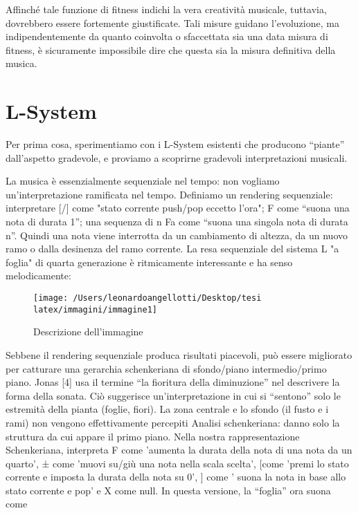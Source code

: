 \documentclass[a4paper,12pt]{report}
\begin{document}
Affinché tale funzione di fitness indichi la vera creatività musicale, tuttavia, dovrebbero essere fortemente giustificate. Tali misure guidano l’evoluzione, ma indipendentemente da quanto coinvolta o sfaccettata sia una data misura di fitness, è sicuramente impossibile dire che questa sia la misura definitiva della musica.

\section{L-System}

Per prima cosa, sperimentiamo con i L-System esistenti che producono “piante” dall’aspetto gradevole, e proviamo a scoprirne gradevoli interpretazioni musicali.

La musica è essenzialmente sequenziale nel tempo: non vogliamo un'interpretazione ramificata nel tempo. 
Definiamo un rendering sequenziale: interpretare [/] come "stato corrente push/pop eccetto l'ora"; 
F come “suona una nota di durata 1”; 
una sequenza di n Fa come “suona una singola nota di durata n”. 
Quindi una nota viene interrotta da un cambiamento di altezza, da un nuovo ramo o dalla desinenza del ramo corrente. 
La resa sequenziale del sistema L "a foglia" di quarta generazione è ritmicamente interessante e ha senso melodicamente:


\begin{figure}[h!]
    \centering
    \texttt{[image: /Users/leonardoangellotti/Desktop/tesi latex/immagini/immagine1]} 
    \caption{Descrizione dell'immagine}
    \label{fig:immagine}
\end{figure}

Sebbene il rendering sequenziale produca risultati piacevoli, può essere migliorato per catturare una gerarchia schenkeriana di sfondo/piano intermedio/primo piano. 
Jonas [4] usa il termine “la fioritura della diminuzione” nel descrivere la forma della sonata. 
Ciò suggerisce un'interpretazione in cui si “sentono” solo le estremità della pianta (foglie, fiori). La zona centrale e lo sfondo (il fusto e i rami) non vengono effettivamente percepiti
Analisi schenkeriana: danno solo la struttura da cui appare il primo piano.
Nella nostra rappresentazione Schenkeriana, interpreta F come 'aumenta la durata della nota di una nota da un quarto', ± come 'muovi su/giù una nota nella scala scelta', [come 'premi lo stato corrente e imposta la durata della nota su 0', ] come ' suona la nota in base allo stato corrente e pop' e X come null.
In questa versione, la “foglia” ora suona come
\end{document}
